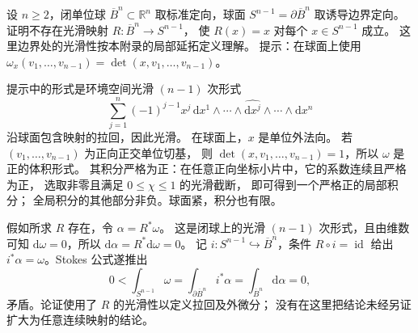 \begin{exercise}\label{b1:ex:E-no-smooth-retraction}
设 \(n\geq2\)，闭单位球 \(\overline B^n\subset\mathbb R^n\)
取标准定向，球面 \(S^{n-1}=\partial\overline B^n\) 取诱导边界定向。
证明不存在光滑映射 \(R:\overline B^n\to S^{n-1}\)，
使 \(R(x)=x\) 对每个 \(x\in S^{n-1}\) 成立。
这里边界处的光滑性按本附录的局部延拓定义理解。
提示：在球面上使用
\(\omega_x(v_1,\ldots,v_{n-1})=\det(x,v_1,\ldots,v_{n-1})\)。
\end{exercise}
\begin{solution}
提示中的形式是环境空间光滑 \((n-1)\) 次形式
\[
 \sum_{j=1}^n(-1)^{j-1}x^j\,
 \mathrm dx^1\wedge\cdots\wedge\widehat{\mathrm dx^j}
                       \wedge\cdots\wedge\mathrm dx^n
\]
沿球面包含映射的拉回，因此光滑。
在球面上，\(x\) 是单位外法向。
若 \((v_1,\ldots,v_{n-1})\) 为正向正交单位切基，
则 \(\det(x,v_1,\ldots,v_{n-1})=1\)，所以 \(\omega\) 是正的体积形式。
其积分严格为正：在任意正向坐标小片中，它的系数连续且严格为正，
选取非零且满足 \(0\leq\chi\leq1\) 的光滑截断，
即可得到一个严格正的局部积分；
全局积分的其他部分非负。球面紧，积分也有限。

假如所求 \(R\) 存在，令 \(\alpha=R^*\omega\)。
这是闭球上的光滑 \((n-1)\) 次形式，且由维数可知
\(\mathrm d\omega=0\)，所以 \(\mathrm d\alpha=R^*\mathrm d\omega=0\)。
记 \(i:S^{n-1}\hookrightarrow\overline B^n\)，条件 \(R\circ i=\operatorname{id}\) 给出
\(i^*\alpha=\omega\)。Stokes 公式遂推出
\[
 0<\int_{S^{n-1}}\omega
   =\int_{\partial\overline B^n}i^*\alpha
   =\int_{\overline B^n}\mathrm d\alpha=0,
\]
矛盾。论证使用了 \(R\) 的光滑性以定义拉回及外微分；
没有在这里把结论未经另证扩大为任意连续映射的结论。
\end{solution}

